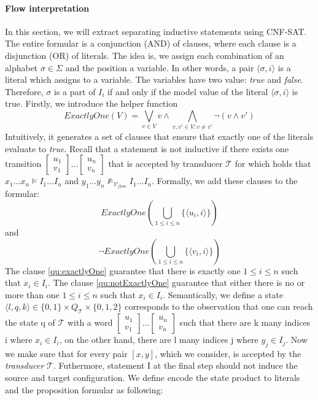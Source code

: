 \paragraph*{Flow interpretation}
In this section, we will extract separating inductive statements using CNF-SAT. 
The entire formular is a conjunction (AND) of clauses, where each clause is a disjunction (OR) of literals.
The idea is, we assign each combination of an alphabet $\sigma \in \Sigma$ and the position 
a variable. 
In other words, a pair $\langle \sigma, i \rangle$ is a literal which assigns to a variable.
The variables have two value: \textit{true} and \textit{false}.
Therefore, $\sigma$ is a part of $I_i$ if and only if the  model value of the literal $\langle \sigma, i \rangle$ is true.
Firstly, we introduce the helper function
\begin{equation*}
    ExactlyOne(V) = \bigvee_{v \in V} v \wedge \bigwedge_{v,v'\in V: v \neq v'} \lnot (v \wedge v')
\end{equation*}
Intuitively, it generates a set of clauses that ensure that exactly one of the 
literals evaluate to \textit{true}.
Recall that a statement is not inductive if there exists one transition
$[\substack{u_1 \\ v_1}] \dots [\substack{u_n \\ v_n}]$ that is accepted by transducer $\mathcal{T}$
for which holds that $x_1 \dots x_n \models I_1 \dots I_n$ and $y_1 \dots y_n \not\models_{\mathcal{V}_{flow}} I_1 \dots I_n$.
Formally, we add these clauses to the formular:
\begin{equation}\label{qu:exactlyOne}
    ExactlyOne(\bigcup_{1 \leq i \leq n} \{ \langle u_i, i \rangle \})
\end{equation}
and 
\begin{equation}\label{qu:notExactlyOne}
    \lnot ExactlyOne(\bigcup_{1 \leq i \leq n} \{ \langle v_i, i \rangle \})
\end{equation}
The clause \ref{qu:exactlyOne} guarantee that there is exactly one
$1 \leq i \leq n$ such that $x_i \in I_i$. 
The clause \ref{qu:notExactlyOne} guarantee that either there is no 
or more than one $1 \leq i \leq n$ such that $x_i \in I_i$.
Semantically, we define a state $\langle l,q,k \rangle \in \{0,1\} \times Q_{\mathcal{T}} \times \{0,1,2\}$ 
corresponds to the observation that one
can reach the state q of $\mathcal{T}$ with a word $[\substack{u_1 \\ v_1}] \dots [\substack{u_n \\ v_n}]$
such that there are k many indices i where $x_i \in I_i$, on the other hand,
there are l many indices j where $y_j \in I_j$.
Now we make sure that for every pair $[x,y]$, which we consider, is accepted
by the \textit{transducer} $\mathcal{T}$.
Futhermore, statement I at the final step should not induce the source and target 
configuration. 
We define encode the state product to literals and the proposition formular as following:

